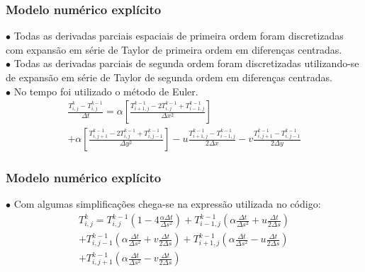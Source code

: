 \documentclass[xcolor=dvipsnames,10pt,aspectratio=169]{beamer}
\begin{document}
	\begin{frame} 
		\frametitle{Modelo numérico explícito}

		$\bullet$ Todas as derivadas parciais espaciais de primeira ordem foram discretizadas com expansão em série de Taylor de primeira ordem em diferenças centradas.\\
		$\bullet$ Todas as derivadas parciais de segunda ordem foram discretizadas utilizando-se de expansão em série de Taylor de segunda ordem em diferenças centradas.\\
		$\bullet$ No tempo foi utilizado o método de Euler.\\

		\begin{equation}
			\begin{split}
			\frac{T_{i,j}^{k} - T_{i , j}^{k-1} }{\Delta t}
			= \alpha \left[  \frac{T_{i+1,j}^{k-1} - 2 T_{i,j}^{k-1} + T_{i-1,j}^{k-1} }{\Delta x^2} \right]\\
			+\alpha \left[\frac{T_{i,j+1}^{k-1} - 2 T_{i,j}^{k-1} + T_{i,j-1}^{k-1}}{\Delta y^2}\right] - u \frac{T_{i+1,j}^{k-1} - T_{i-1,j}^{k-1}}{2 \Delta x} - v \frac{T_{i,j+1}^{k-1} - T_{i , j-1}^{k-1}}{2 \Delta y}  
			\end{split}
		\end{equation}

	\end{frame}





	\begin{frame} 
		\frametitle{Modelo numérico explícito}
		$\bullet$ Com algumas simplificações chega-se na expressão utilizada no código:
		\begin{equation}
			\begin{split}
			T_{i,j}^{k} = T_{i,j}^{k-1} \left( 1 - 4 \frac{\alpha \Delta t}{\Delta s ^2}\right) + T_{i -1, j}^{k-1} \left( \alpha \frac{\Delta t}{\Delta s^2} + u \frac{\Delta t}{2 \Delta s} \right)\\
			+ T_{i,j-1}^{k-1} \left( \alpha \frac{\Delta t}{\Delta s^2} + v \frac{\Delta t}{2 \Delta s} \right) +  T_{i+1,j}^{k-1} \left( \alpha \frac{\Delta t}{ \Delta s^2} - u \frac{\Delta t}{2 \Delta s}\right) \\
			+  T_{i,j+1}^{k-1} \left( \alpha \frac{\Delta t}{\Delta s^2} - v \frac{\Delta t}{2 \Delta s}\right)
			\end{split}
		\end{equation}
	\end{frame}
\end{document}
